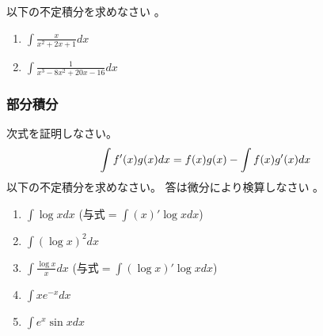 \documentclass[twocolumn,11pt]{jarticle}
\begin{document}
\exercise
以下の不定積分を求めなさい
。
\begin{enumerate}
\item \label{iitem:x/(x^x+2x+1)}$\displaystyle\int\frac{x}{x^2+2x+1}dx$
\item \label{iitem:1/(x^3-8x^2+20x-16)}$\displaystyle\int\frac{1}{x^3-8x^2+20x-16}dx$
\end{enumerate}

\subsubsection{部分積分}
\question
次式を証明しなさい。
\begin{align}
  \int f'(x)g(x)dx = f(x)g(x)-\int f(x)g'(x)dx\notag
\end{align}
\exercise
以下の不定積分を求めなさい。
答は微分により検算しなさい
。
\begin{enumerate}
\item \label{item:logx}$\displaystyle\int \log x dx$
  \quad(与式$=\int(x)'\log x dx$)
\item \label{item:(logx)2}$\displaystyle\int (\log x)^2 dx$
\item \label{item:logx/x}$\displaystyle\int \frac{\log x}{x}dx$
  \quad(与式$=\int(\log x)'\log x dx$)
\item \label{item:xe-x}$\displaystyle\int xe^{-x} dx$
\item \label{item:e2sinx}$\displaystyle\int e^x\sin x dx$
\end{enumerate}
\end{document}
